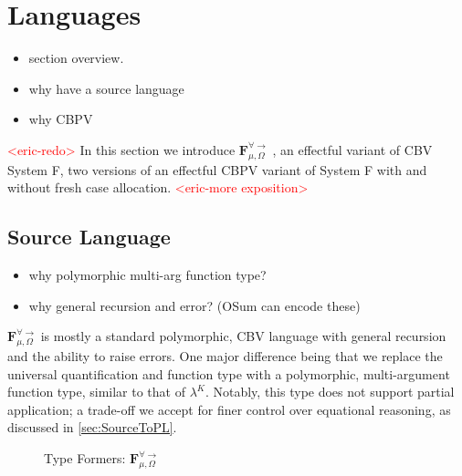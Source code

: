 \documentclass[acmsmall]{acmart}
\newcommand{\eric}[1]{\textcolor{red}{ <eric-#1> }}
\newcommand{\source}{$\mathbf{F}_{\mu,\Omega}^{\forall\to}\;$}
\begin{document}
\section{Languages}\label{sec:Languages}
\begin{itemize}
  \item section overview.
  \item why have a source language
  \item why CBPV
\end{itemize}
\eric{redo}
In this section we introduce \source, an effectful variant of CBV System F, two versions of an effectful CBPV variant of System F with and without fresh case allocation. \eric{more exposition}

\subsection{Source Language}\label{sec:SourceLang}
\begin{itemize}
  \item why polymorphic multi-arg function type?
  \item why general recursion and error? (OSum can encode these)
\end{itemize}
\source is mostly a standard polymorphic, CBV language with general recursion and the ability to raise errors. One major difference being that we replace the universal quantification and function type with a polymorphic, multi-argument function type, similar to that of $\lambda^K$\cite{SysFtoTAL}. Notably, this type does not support partial application; a trade-off we accept for finer control over equational reasoning, as discussed in \cref{sec:SourceToPL}.

\begin{figure}[H]
  \caption{Type Formers: \source}
  \label{fig:value-type-formers}
\end{figure}
\end{document}
